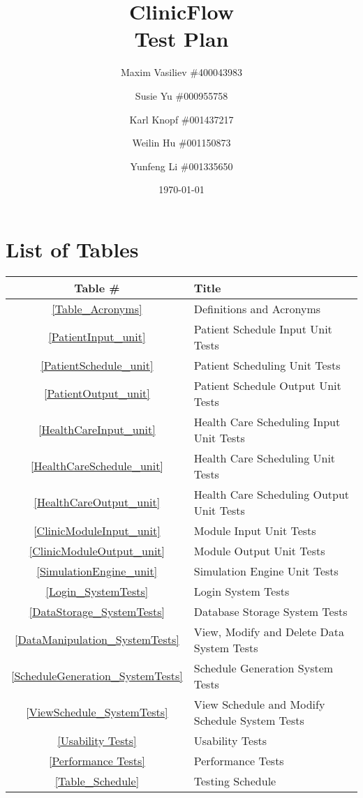 \documentclass[12pt]{article}
\title{
ClinicFlow
\\\vspace{10mm}
\large \textbf{Test Plan}
\vspace{40mm}
}
\author{ Maxim Vasiliev \#400043983
\and
Susie Yu \#000955758
\and
Karl Knopf \#001437217
\and
Weilin Hu \#001150873
\and
Yunfeng Li \#001335650
}
\date{\today}
\begin{document}
\maketitle
\newpage
\tableofcontents
\newpage
{}

\section*{List of Tables}

\begin{center}
\begin{tabular}{cl}
\toprule

\bf Table \# & \bf Title\\\midrule

\ref{Table_Acronyms} & Definitions and Acronyms\\
\ref{PatientInput_unit} & Patient Schedule Input Unit Tests \\
\ref{PatientSchedule_unit}& Patient Scheduling Unit Tests\\
\ref{PatientOutput_unit} & Patient Schedule Output Unit Tests \\
\ref{HealthCareInput_unit}& Health Care Scheduling Input Unit Tests\\
\ref{HealthCareSchedule_unit}& Health Care Scheduling Unit Tests \\
\ref{HealthCareOutput_unit}& Health Care Scheduling Output Unit Tests \\
\ref{ClinicModuleInput_unit}& Module Input Unit Tests \\
\ref{ClinicModuleOutput_unit} &Module Output Unit Tests \\
\ref{SimulationEngine_unit} & Simulation Engine Unit Tests \\

\ref{Login_SystemTests} & Login System Tests \\
\ref{DataStorage_SystemTests} & Database Storage System Tests \\
\ref{DataManipulation_SystemTests} & View, Modify and Delete Data System Tests \\
\ref{ScheduleGeneration_SystemTests} & Schedule Generation System Tests \\
\ref{ViewSchedule_SystemTests} & View Schedule and Modify Schedule System Tests \\
\ref{Usability Tests} & Usability Tests \\
\ref{Performance Tests} & Performance Tests \\
\ref{Table_Schedule} & Testing Schedule \\
\bottomrule
\end{tabular}
\end{center}
\end{document}

